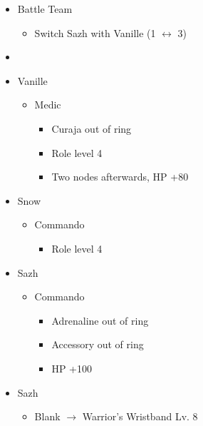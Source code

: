 \documentclass{report}
\begin{document}
\begin{menu}
\begin{itemize}
    \paradigm
    \begin{itemize}
        \item Battle Team
        \begin{itemize}
            \item Switch Sazh with Vanille (1 $\leftrightarrow$ 3)
        \end{itemize}
        \item {}%
{\paradigmline{(\med)}{\com}{(\com)}}%
{\paradigmline{(\sab)}{\com}{\com}}%
{\paradigmline{(\sab)}{\sen}{(\syn)}}%
{\paradigmline{(\rav)}{(\rav)}{\com}}%
{\paradigmline{\textit{(\sab)}}{\textit{(\rav)}}{\textit{\rav}}}%
{\paradigmline{\rav}{\rav}{\rav}}
    \end{itemize}
    \crystarium
    \begin{itemize}
        \item Vanille
        \begin{itemize}
            \item Medic
            \begin{itemize}
                \item Curaja out of ring
                \item Role level 4
                \item Two nodes afterwards, HP +80
            \end{itemize}
        \end{itemize}
        \item Snow
        \begin{itemize}
            \item Commando
            \begin{itemize}
                \item Role level 4
            \end{itemize}
        \end{itemize}
        \item Sazh
        \begin{itemize}
            \item Commando
            \begin{itemize}
                \item Adrenaline out of ring
                \item Accessory out of ring
                \item HP +100
            \end{itemize}
        \end{itemize}
    \end{itemize}
    \equip
    \begin{itemize}
        \item Sazh
        \begin{itemize}
            \item Blank $\rightarrow$ Warrior's Wristband Lv. 8
        \end{itemize}
    \end{itemize}
\end{itemize}
\end{menu}
\end{document}
